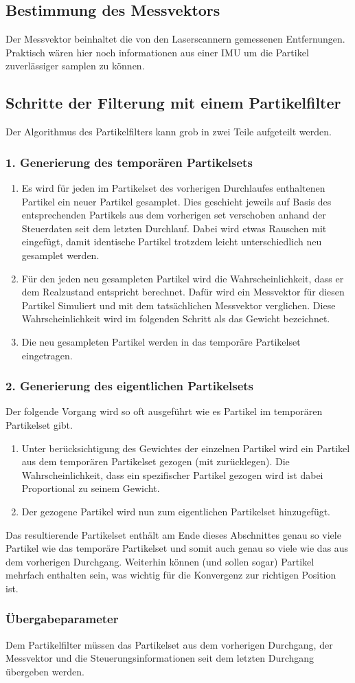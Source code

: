 \documentclass{../Vorlage/mat}
\begin{document}
\subsection*{Bestimmung des Messvektors}
Der Messvektor beinhaltet die von den Laserscannern gemessenen Entfernungen. Praktisch wären hier noch informationen aus einer IMU um die Partikel zuverlässiger samplen zu können.
\subsection*{Schritte der Filterung mit einem Partikelfilter}
Der Algorithmus des Partikelfilters kann grob in zwei Teile aufgeteilt werden.
\subsubsection*{1. Generierung des temporären Partikelsets}
\begin{enumerate}
	\item Es wird für jeden im Partikelset des vorherigen Durchlaufes enthaltenen Partikel ein neuer Partikel gesamplet. Dies geschieht jeweils auf Basis des entsprechenden Partikels aus dem vorherigen set verschoben anhand der Steuerdaten seit dem letzten Durchlauf. Dabei wird etwas Rauschen mit eingefügt, damit identische Partikel trotzdem leicht unterschiedlich neu gesamplet werden.
	\item Für den jeden neu gesampleten Partikel wird die Wahrscheinlichkeit, dass er dem Realzustand entspricht berechnet. Dafür wird ein Messvektor für diesen Partikel Simuliert und mit dem tatsächlichen Messvektor verglichen. Diese Wahrscheinlichkeit wird im folgenden Schritt als das Gewicht bezeichnet.
	\item Die neu gesampleten Partikel werden in das temporäre Partikelset eingetragen.
\end{enumerate}
\subsubsection*{2. Generierung des eigentlichen Partikelsets}
Der folgende Vorgang wird so oft ausgeführt wie es Partikel im temporären Partikelset gibt.
\begin{enumerate} 
	\item Unter berücksichtigung des Gewichtes der einzelnen Partikel wird ein Partikel aus dem temporären Partikelset gezogen (mit zurücklegen). Die Wahrscheinlichkeit, dass ein spezifischer Partikel gezogen wird ist dabei Proportional zu seinem Gewicht.
	\item Der gezogene Partikel wird nun zum eigentlichen Partikelset hinzugefügt.
\end{enumerate}
Das resultierende Partikelset enthält am Ende dieses Abschnittes genau so viele Partikel wie das temporäre Partikelset und somit auch genau so viele wie das aus dem vorherigen Durchgang. Weiterhin können (und sollen sogar) Partikel mehrfach enthalten sein, was wichtig für die Konvergenz zur richtigen Position ist.
\subsubsection*{Übergabeparameter}
Dem Partikelfilter müssen das Partikelset aus dem vorherigen Durchgang, der Messvektor und die Steuerungsinformationen seit dem letzten Durchgang übergeben werden.\\
\end{document}

